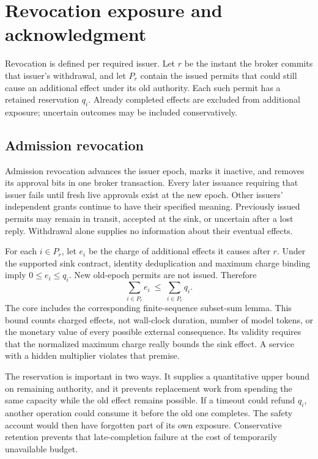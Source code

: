 \section{Revocation exposure and acknowledgment}
\label{sec:v2revocation}
Revocation is defined per required issuer. Let $r$ be the instant the broker
commits that issuer's withdrawal, and let $P_r$ contain the issued permits that
could still cause an additional effect under its old authority. Each such
permit has a retained reservation $q_i$. Already completed effects are excluded
from additional exposure; uncertain outcomes may be included conservatively.

\subsection{Admission revocation}
Admission revocation advances the issuer epoch, marks it inactive, and removes
its approval bits in one broker transaction. Every later issuance requiring
that issuer fails until fresh live approvals exist at the new epoch. Other
issuers' independent grants continue to have their specified meaning.
Previously issued permits may remain in transit, accepted at the sink, or
uncertain after a lost reply. Withdrawal alone supplies no information about
their eventual effects.

For each $i\in P_r$, let $e_i$ be the charge of additional effects it causes
after $r$. Under the supported sink contract, identity deduplication and maximum
charge binding imply $0\le e_i\le q_i$. New old-epoch permits are not issued.
Therefore
\begin{equation}
       \sum_{i\in P_r} e_i\ \le\ \sum_{i\in P_r}q_i .
\label{eq:v2exposure}
\end{equation}
The core includes the corresponding finite-sequence subset-sum lemma. This
bound counts charged effects, not wall-clock duration, number of model tokens,
or the monetary value of every possible external consequence. Its validity
requires that the normalized maximum charge really bounds the sink effect.
A service with a hidden multiplier violates that premise.

The reservation is important in two ways. It supplies a quantitative upper
bound on remaining authority, and it prevents replacement work from spending
the same capacity while the old effect remains possible. If a timeout could
refund $q_i$, another operation could consume it before the old one completes.
The safety account would then have forgotten part of its own exposure.
Conservative retention prevents that late-completion failure at the cost of
temporarily unavailable budget.

